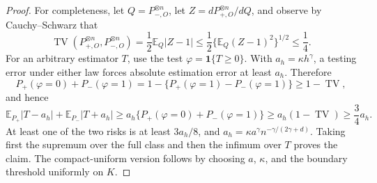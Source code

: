 \documentclass{article}
\begin{document}
\begin{proof}
For completeness, let \(Q=P_{-,O}^{\otimes n}\), let \(Z=dP_{+,O}^{\otimes n}/dQ\), and observe by Cauchy--Schwarz that
\[
 \operatorname{TV}(P_{+,O}^{\otimes n},P_{-,O}^{\otimes n})
 =\frac12\mathbb E_Q|Z-1|
 \leq\frac12\{\mathbb E_Q(Z-1)^2\}^{1/2}\leq\frac14.
\]
For an arbitrary estimator \(T\), use the test \(\varphi=\mathbf1\{T\geq0\}\).  With \(a_h=\kappa h^\gamma\), a testing error under either law forces absolute estimation error at least \(a_h\).  Therefore
\[
 P_+(\varphi=0)+P_-(\varphi=1)
 =1-\{P_+(\varphi=1)-P_-(\varphi=1)\}\geq1-\operatorname{TV},
\]
and hence
\[
 \mathbb E_{P_+}|T-a_h|+\mathbb E_{P_-}|T+a_h|
 \geq a_h\{P_+(\varphi=0)+P_-(\varphi=1)\}
 \geq a_h(1-\operatorname{TV})\geq\frac34a_h.
\]
At least one of the two risks is at least \(3a_h/8\), and \(a_h=\kappa a^\gamma n^{-\gamma/(2\gamma+d)}\).  Taking first the supremum over the full class and then the infimum over \(T\) proves the claim.  The compact-uniform version follows by choosing \(a\), \(\kappa\), and the boundary threshold uniformly on \(K\).
\end{proof}
\end{document}
